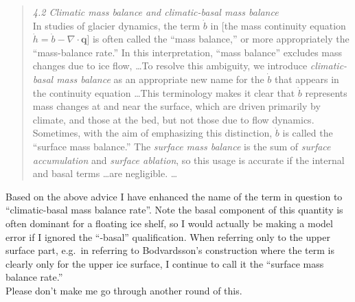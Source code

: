 \documentclass[11pt,reqno]{amsart}
\begin{document}
\begin{itemize}
{\begin{quote}
\emph{4.2 Climatic mass balance and climatic-basal mass balance}
\smallskip \\
In studies of glacier dynamics, the term $\dot b$ in [the mass continuity equation $\dot h = \dot b - \nabla \cdot \mathbf{q}$] is often called the ``mass balance,'' or more appropriately the ``mass-balance rate.''  In this interpretation, ``mass balance'' excludes mass changes due to ice flow, \dots  To resolve this ambiguity, we introduce \emph{climatic-basal mass balance} as an appropriate new name for the $\dot b$ that appears in the continuity equation \dots  This terminology makes it clear that $\dot b$ represents mass changes at and near the surface, which are driven primarily by climate, and those at the bed, but not those due to flow dynamics.
\smallskip \\
Sometimes, with the aim of emphasizing this distinction, $\dot b$ is called the ``surface mass balance.''  The \emph{surface mass balance} is the sum of \emph{surface accumulation} and \emph{surface ablation}, so this usage is accurate if the internal and basal terms \dots are negligible.  \dots
\end{quote} \medskip
Based on the above advice I have enhanced the name of the term in question to ``climatic-basal mass balance rate''.  Note the basal component of this quantity is often dominant for a floating ice shelf, so I would actually be making a model error if I ignored the ``-basal'' qualification.  When referring only to the upper surface part, e.g.~in referring to Bodvardsson's construction where the term is clearly only for the upper ice surface, I continue to call it the ``surface mass balance rate.'' \medskip \\
Please don't make me go through another round of this.}

\end{itemize}


%
%
\end{document}
